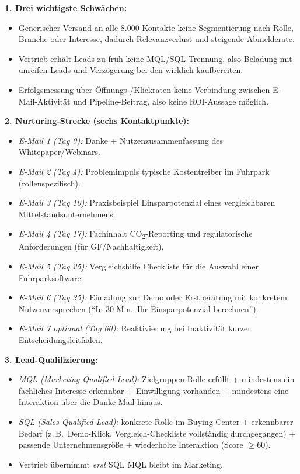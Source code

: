 \documentclass[11pt,a4paper,oneside]{article}
\begin{document}
\begin{loesungbox}
\textbf{1. Drei wichtigste Schwächen:}
\begin{itemize}
  \item Generischer Versand an alle 8.000 Kontakte \textendash{} keine Segmentierung nach Rolle, Branche oder Interesse, dadurch Relevanzverlust und steigende Abmelderate.
  \item Vertrieb erhält Leads zu früh \textendash{} keine MQL/SQL-Trennung, also Beladung mit unreifen Leads und Verzögerung bei den wirklich kaufbereiten.
  \item Erfolgsmessung über Öffnungs-/Klickraten \textendash{} keine Verbindung zwischen E-Mail-Aktivität und Pipeline-Beitrag, also keine ROI-Aussage möglich.
\end{itemize}

\smallskip
\textbf{2. Nurturing-Strecke (sechs Kontaktpunkte):}
\begin{itemize}
  \item \emph{E-Mail 1 (Tag 0):} Danke + Nutzenzusammenfassung des Whitepaper/Webinars.
  \item \emph{E-Mail 2 (Tag 4):} Problemimpuls \textendash{} typische Kostentreiber im Fuhrpark (rollenspezifisch).
  \item \emph{E-Mail 3 (Tag 10):} Praxisbeispiel \textendash{} Einsparpotenzial eines vergleichbaren Mittelstandsunternehmens.
  \item \emph{E-Mail 4 (Tag 17):} Fachinhalt \textendash{} CO\textsubscript{2}-Reporting und regulatorische Anforderungen (für GF/Nachhaltigkeit).
  \item \emph{E-Mail 5 (Tag 25):} Vergleichshilfe \textendash{} Checkliste für die Auswahl einer Fuhrparksoftware.
  \item \emph{E-Mail 6 (Tag 35):} Einladung zur Demo oder Erstberatung mit konkretem Nutzenversprechen (``In 30 Min.\ Ihr Einsparpotenzial berechnen'').
  \item \emph{E-Mail 7 optional (Tag 60):} Reaktivierung bei Inaktivität \textendash{} kurzer Entscheidungsleitfaden.
\end{itemize}

\smallskip
\textbf{3. Lead-Qualifizierung:}
\begin{itemize}
  \item \emph{MQL (Marketing Qualified Lead):} Zielgruppen-Rolle erfüllt + mindestens ein fachliches Interesse erkennbar + Einwilligung vorhanden + mindestens eine Interaktion über die Danke-Mail hinaus.
  \item \emph{SQL (Sales Qualified Lead):} konkrete Rolle im Buying-Center + erkennbarer Bedarf (z.\,B.\ Demo-Klick, Vergleich-Checkliste vollständig durchgegangen) + passende Unternehmensgröße + wiederholte Interaktion (Score $\geq 60$).
  \item Vertrieb übernimmt \emph{erst} SQL \textendash{} MQL bleibt im Marketing.
\end{itemize}


\end{loesungbox}
\end{document}
